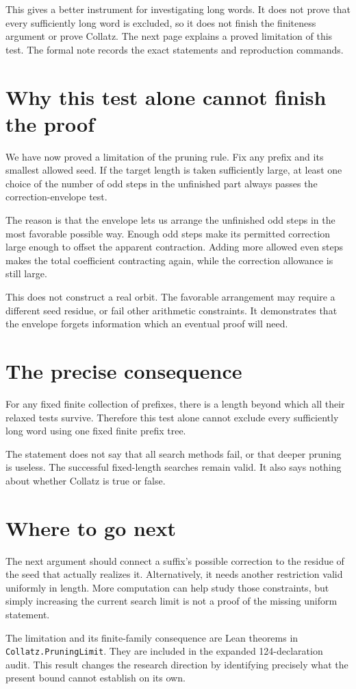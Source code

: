\documentclass[10pt]{article}
\begin{document}
This gives a better instrument for investigating long words. It does not prove that every sufficiently long word is excluded, so it does not finish the finiteness argument or prove Collatz. The next page explains a proved limitation of this test. The formal note records the exact statements and reproduction commands.

\newpage
\section{Why this test alone cannot finish the proof}
We have now proved a limitation of the pruning rule. Fix any prefix and its smallest allowed seed. If the target length is taken sufficiently large, at least one choice of the number of odd steps in the unfinished part always passes the correction-envelope test.

The reason is that the envelope lets us arrange the unfinished odd steps in the most favorable possible way. Enough odd steps make its permitted correction large enough to offset the apparent contraction. Adding more allowed even steps makes the total coefficient contracting again, while the correction allowance is still large.

This does not construct a real orbit. The favorable arrangement may require a different seed residue, or fail other arithmetic constraints. It demonstrates that the envelope forgets information which an eventual proof will need.

\section{The precise consequence}
For any fixed finite collection of prefixes, there is a length beyond which all their relaxed tests survive. Therefore this test alone cannot exclude every sufficiently long word using one fixed finite prefix tree.

The statement does not say that all search methods fail, or that deeper pruning is useless. The successful fixed-length searches remain valid. It also says nothing about whether Collatz is true or false.

\section{Where to go next}
The next argument should connect a suffix's possible correction to the residue of the seed that actually realizes it. Alternatively, it needs another restriction valid uniformly in length. More computation can help study those constraints, but simply increasing the current search limit is not a proof of the missing uniform statement.

The limitation and its finite-family consequence are Lean theorems in \texttt{Collatz.PruningLimit}. They are included in the expanded 124-declaration audit. This result changes the research direction by identifying precisely what the present bound cannot establish on its own.
\end{document}
